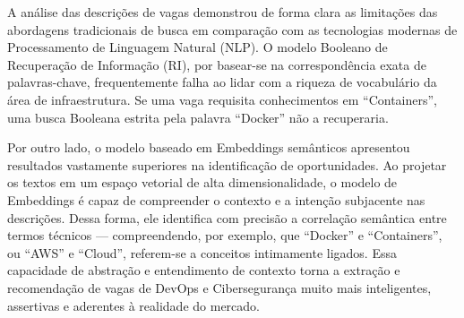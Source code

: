 \documentclass[
  letterpaper,
  DIV=11,
  numbers=noendperiod]{scrartcl}
\begin{document}
A análise das descrições de vagas demonstrou de forma clara as
limitações das abordagens tradicionais de busca em comparação com as
tecnologias modernas de Processamento de Linguagem Natural (NLP). O
modelo Booleano de Recuperação de Informação (RI), por basear-se na
correspondência exata de palavras-chave, frequentemente falha ao lidar
com a riqueza de vocabulário da área de infraestrutura. Se uma vaga
requisita conhecimentos em ``Containers'', uma busca Booleana estrita
pela palavra ``Docker'' não a recuperaria.

Por outro lado, o modelo baseado em Embeddings semânticos apresentou
resultados vastamente superiores na identificação de oportunidades. Ao
projetar os textos em um espaço vetorial de alta dimensionalidade, o
modelo de Embeddings é capaz de compreender o contexto e a intenção
subjacente nas descrições. Dessa forma, ele identifica com precisão a
correlação semântica entre termos técnicos --- compreendendo, por
exemplo, que ``Docker'' e ``Containers'', ou ``AWS'' e ``Cloud'',
referem-se a conceitos intimamente ligados. Essa capacidade de abstração
e entendimento de contexto torna a extração e recomendação de vagas de
DevOps e Cibersegurança muito mais inteligentes, assertivas e aderentes
à realidade do mercado.
\end{document}
